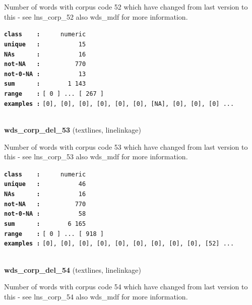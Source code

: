 \documentclass[]{article}
\begin{document}
Number of words with corpus code 52 which have changed from last version
to this - see lns\_corp\_52 also wds\_mdf for more information.

\textbf{\texttt{class\ \ \ \ :}} \texttt{~~~~~numeric}\\
\textbf{\texttt{unique\ \ \ :}} \texttt{~~~~~~~~~~15}\\
\textbf{\texttt{NAs\ \ \ \ \ \ :}} \texttt{~~~~~~~~~~16}\\
\textbf{\texttt{not-NA\ \ \ :}} \texttt{~~~~~~~~~770}\\
\textbf{\texttt{not-0-NA\ :}} \texttt{~~~~~~~~~~13}\\
\textbf{\texttt{sum\ \ \ \ \ \ :}} \texttt{~~~~~~~1~143}\\
\textbf{\texttt{range\ \ \ \ :}}
\texttt{{[}\ 0\ {]}\ ...\ {[}\ 267\ {]}}\\
\textbf{\texttt{examples\ :}}
\texttt{{[}0{]},\ {[}0{]},\ {[}0{]},\ {[}0{]},\ {[}0{]},\ {[}0{]},\ {[}NA{]},\ {[}0{]},\ {[}0{]},\ {[}0{]}\ ...}\\

~

\textbf{wds\_corp\_del\_53} (textlines, linelinkage)

Number of words with corpus code 53 which have changed from last version
to this - see lns\_corp\_53 also wds\_mdf for more information.

\textbf{\texttt{class\ \ \ \ :}} \texttt{~~~~~numeric}\\
\textbf{\texttt{unique\ \ \ :}} \texttt{~~~~~~~~~~46}\\
\textbf{\texttt{NAs\ \ \ \ \ \ :}} \texttt{~~~~~~~~~~16}\\
\textbf{\texttt{not-NA\ \ \ :}} \texttt{~~~~~~~~~770}\\
\textbf{\texttt{not-0-NA\ :}} \texttt{~~~~~~~~~~58}\\
\textbf{\texttt{sum\ \ \ \ \ \ :}} \texttt{~~~~~~~6~165}\\
\textbf{\texttt{range\ \ \ \ :}}
\texttt{{[}\ 0\ {]}\ ...\ {[}\ 918\ {]}}\\
\textbf{\texttt{examples\ :}}
\texttt{{[}0{]},\ {[}0{]},\ {[}0{]},\ {[}0{]},\ {[}0{]},\ {[}0{]},\ {[}0{]},\ {[}0{]},\ {[}0{]},\ {[}52{]}\ ...}\\

~

\textbf{wds\_corp\_del\_54} (textlines, linelinkage)

Number of words with corpus code 54 which have changed from last version
to this - see lns\_corp\_54 also wds\_mdf for more information.
\end{document}
